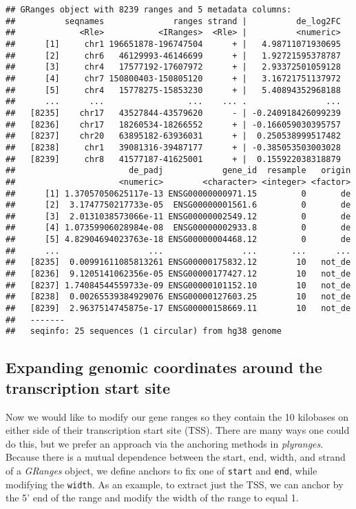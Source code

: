 \documentclass[
]{article}
\begin{document}
\begin{verbatim}
## GRanges object with 8239 ranges and 5 metadata columns:
##          seqnames              ranges strand |          de_log2FC
##             <Rle>           <IRanges>  <Rle> |          <numeric>
##      [1]     chr1 196651878-196747504      + |   4.98711071930695
##      [2]     chr6   46129993-46146699      + |   1.92721595378787
##      [3]     chr4   17577192-17607972      + |   2.93372501059128
##      [4]     chr7 150800403-150805120      + |   3.16721751137972
##      [5]     chr4   15778275-15853230      + |   5.40894352968188
##      ...      ...                 ...    ... .                ...
##   [8235]    chr17   43527844-43579620      - | -0.240918426099239
##   [8236]    chr17   18260534-18266552      + | -0.166059030395757
##   [8237]    chr20   63895182-63936031      + |  0.250538999517482
##   [8238]     chr1   39081316-39487177      + | -0.385053503003028
##   [8239]     chr8   41577187-41625001      + |  0.155922038318879
##                       de_padj            gene_id  resample   origin
##                     <numeric>        <character> <integer> <factor>
##      [1] 1.37057050625117e-13 ENSG00000000971.15         0       de
##      [2]  3.1747750217733e-05  ENSG00000001561.6         0       de
##      [3]  2.0131038573066e-11 ENSG00000002549.12         0       de
##      [4] 1.07359906028984e-08  ENSG00000002933.8         0       de
##      [5] 4.82904694023763e-18 ENSG00000004468.12         0       de
##      ...                  ...                ...       ...      ...
##   [8235]  0.00991611085813261 ENSG00000175832.12        10   not_de
##   [8236]  9.1205141062356e-05 ENSG00000177427.12        10   not_de
##   [8237] 1.74084544559733e-09 ENSG00000101152.10        10   not_de
##   [8238]  0.00265539384929076 ENSG00000127603.25        10   not_de
##   [8239]  2.9637514745875e-17 ENSG00000158669.11        10   not_de
##   -------
##   seqinfo: 25 sequences (1 circular) from hg38 genome
\end{verbatim}

\hypertarget{expanding-genomic-coordinates-around-the-transcription-start-site}{%
\subsection{Expanding genomic coordinates around the transcription start site}\label{expanding-genomic-coordinates-around-the-transcription-start-site}}

Now we would like to modify our gene ranges so they contain the 10 kilobases on
either side of their transcription start site (TSS). There are many ways one
could do this, but we prefer an approach via the anchoring methods in
\emph{plyranges}. Because there is a mutual dependence between the start, end,
width, and strand of a \emph{GRanges} object, we define anchors to fix one of
\texttt{start} and \texttt{end}, while modifying the \texttt{width}. As an example, to extract just
the TSS, we can anchor by the 5' end of the range and modify the width of the
range to equal 1.
\end{document}

